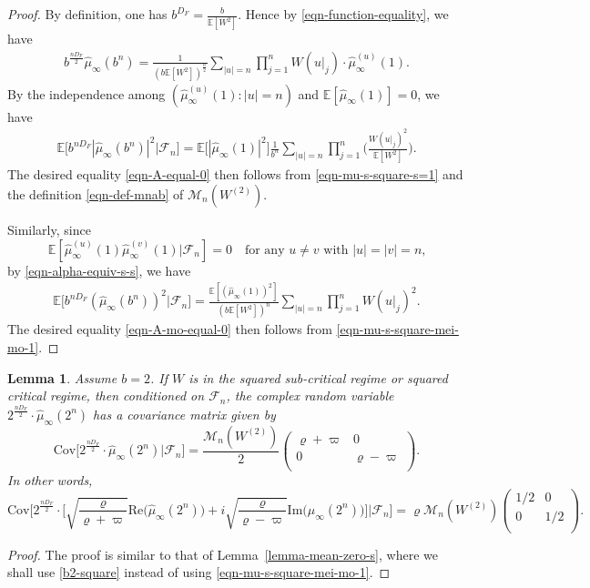 \documentclass[12pt]{amsart}
\newtheorem{lemma}[theorem]{Lemma}
\theoremstyle{definition}
\theoremstyle{remark}
\newcommand{\E}{\mathbb{E}}
\newcommand{\MAB}{\mathscr{M}_{n}(W^{(2)})}
\numberwithin{equation}{section}
\begin{document}
\begin{proof}
By definition, one has $b^{D_F}=\frac{b}{\E[W^2]}$.
Hence by \eqref{eqn-function-equality}, we have
\begin{align}\label{eqn-alpha-equiv-s-s}
b^{\frac{n D_F}{2}} \widehat{\mu}_{\infty}(b^n)=\frac{1}{(b\E[W^2])^{\frac{n}{2}}}\sum_{|u|=n}  \prod_{j=1}^{n} W(u|_j)  \cdot \widehat{\mu}_{\infty}^{(u)}(1) .
\end{align}
By the independence among $(\widehat{\mu}_\infty^{(u)}(1): |u|=n)$ and $\E[\widehat{\mu}_\infty(1)]=0$, we have 
\begin{align*}
\E\Big[ b^{n D_F}|\widehat{\mu}_{\infty}(b^n)|^2 \big| \mathscr{F}_{n}\Big]
= \E\big[|\widehat{\mu}_{\infty}(1)|^2\big]\frac{1}{b^n}\sum_{|u|=n} \prod_{j=1}^{n} \Big(\frac{W(u|_j)^2}{\E[W^2]}\Big). 
\end{align*}
The desired equality \eqref{eqn-A-equal-0} then follows from  \eqref{eqn-mu-s-square-s=1} and the definition \eqref{eqn-def-mnab} of $\MAB$. 

Similarly,  since 
\[
\E [\widehat{\mu}_{\infty}^{(u)}(1) \widehat{\mu}_{\infty}^{(v)}(1)| \mathscr{F}_n] = 0 \quad \text{for any  $u\ne v$ with $|u|=|v|=n$,}
\]
by \eqref{eqn-alpha-equiv-s-s}, 
 we have 
\begin{align*}
\E\Big[ b^{n D_F}(\widehat{\mu}_{\infty}(b^n))^2 \big| \mathscr{F}_{n}\Big]
 = \frac{ \E[(\widehat{\mu}_{\infty} (1))^2]}{(b\E[W^2])^{n}}\sum_{|u|=n}  \prod_{j=1}^{n} W(u|_j)^2.  
\end{align*}
The desired equality \eqref{eqn-A-mo-equal-0} then follows from \eqref{eqn-mu-s-square-mei-mo-1}. 
\end{proof}

\begin{lemma}\label{lem-b2}
Assume $b  = 2$. If  $W$ is in the squared sub-critical regime or squared critical regime, then  conditioned on $\mathscr{F}_{n}$,   the complex random variable $2^{\frac{n D_F}{2}}\cdot \widehat{\mu}_{\infty}(2^n)$ has a covariance matrix given by 
\[
\mathrm{Cov}\Big[2^{\frac{n D_F}{2}}\cdot \widehat{\mu}_{\infty}(2^n)\big| \mathscr{F}_{n}\Big]=\frac{\MAB}{2}
\begin{pmatrix}
\varrho+\varpi&0\\
0&\varrho-\varpi\\
\end{pmatrix}.
\]
In other words, 
\[
\mathrm{Cov}\Bigg[2^{\frac{nD_F}{2}}  \cdot  \Big[   \sqrt{ \frac{\varrho}{\varrho+\varpi}} \mathrm{Re} \big(\widehat{\mu}_{\infty}(2^n)\big) + i  \sqrt{ \frac{\varrho}{\varrho-\varpi}} \mathrm{Im} \big(\widehat{\mu}_{\infty}(2^n)\big) \Big] \Big| \mathscr{F}_n  \Bigg] = \varrho\MAB
\begin{pmatrix}
1/2&0\\
0&1/2\\
\end{pmatrix}.
\]
\end{lemma}
\begin{proof}
The proof is similar to that of Lemma~\ref{lemma-mean-zero-s}, where we shall use \eqref{b2-square} instead of using \eqref{eqn-mu-s-square-mei-mo-1}.  
\end{proof}
\end{document}
